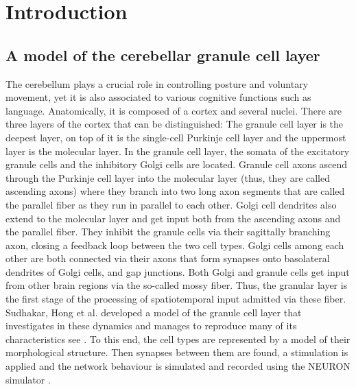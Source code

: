 \documentclass[12pt]{report}
\begin{document}
\newpage


\tableofcontents
\newpage

\sectionfont{\scshape}





\section{Introduction}

\subsection{A model of the cerebellar granule cell layer}
The cerebellum plays a crucial role in controlling posture and voluntary movement, yet it is also associated to various cognitive functions such as language. Anatomically, it is composed of a cortex and several nuclei. There are three layers of the cortex that can be distinguished: The granule cell layer is the deepest layer, on top of it is the single-cell Purkinje cell layer and the uppermost layer is the molecular layer. In the granule cell layer, the somata of the excitatory granule cells and the inhibitory Golgi cells are located. Granule cell axons ascend through the Purkinje cell layer into the molecular layer (thus, they are called ascending axons) where they branch into two long axon segments that are called the parallel fiber as they run in parallel to each other. Golgi cell dendrites also extend to the molecular layer and get input both from the ascending axons and the parallel fiber. They inhibit the granule cells via their sagittally branching axon, closing a feedback loop between the two cell types. Golgi cells among each other are both connected via their axons that form synapses onto basolateral dendrites of Golgi cells, and gap junctions. Both Golgi and granule cells get input from other brain regions via the so-called mossy fiber. Thus, the granular layer is the first stage of the processing of spatiotemporal input admitted via these fiber. Sudhakar, Hong et al. developed a model of the granule cell layer that investigates in these dynamics and manages to reproduce many of its characteristics see \cite{r:Sudha17}. To this end, the cell types are represented by a model of their morphological structure. Then synapses between them are found, a stimulation is applied and the network behaviour is simulated and recorded using the NEURON simulator \cite{r:NEURON06}.
\end{document}
